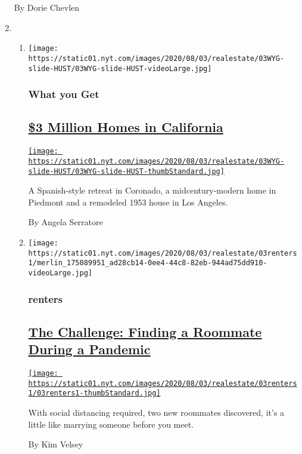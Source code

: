 \begin{enumerate}
  By Dorie Chevlen
\item
  \begin{enumerate}
  \def\labelenumii{\arabic{enumii}.}
  \item
    \texttt{[image: https://static01.nyt.com/images/2020/08/03/realestate/03WYG-slide-HUST/03WYG-slide-HUST-videoLarge.jpg]}

    \hypertarget{what-you-get}{%
    \subsubsection{What you Get}\label{what-you-get}}

    \hypertarget{3-million-homes-in-california}{%
    \subsection{\texorpdfstring{\href{/2020/08/03/realestate/3-million-dollar-homes-for-sale-ca.html}{\$3
    Million Homes in
    California}}{\$3 Million Homes in California}}\label{3-million-homes-in-california}}

    \href{/2020/08/03/realestate/3-million-dollar-homes-for-sale-ca.html}{\texttt{[image: https://static01.nyt.com/images/2020/08/03/realestate/03WYG-slide-HUST/03WYG-slide-HUST-thumbStandard.jpg]}}

    A Spanish-style retreat in Coronado, a midcentury-modern home in
    Piedmont and a remodeled 1953 house in Los Angeles.

    By Angela Serratore
  \item
    \texttt{[image: https://static01.nyt.com/images/2020/08/03/realestate/03renters1/merlin\_175089951\_ad28cb14-0ee4-44c8-82eb-944ad75dd910-videoLarge.jpg]}

    \hypertarget{renters}{%
    \subsubsection{renters}\label{renters}}

    \hypertarget{the-challenge-finding-a-roommate-during-a-pandemic}{%
    \subsection{\texorpdfstring{\href{/2020/08/03/realestate/coronavirus-roommate-renters.html}{The
    Challenge: Finding a Roommate During a
    Pandemic}}{The Challenge: Finding a Roommate During a Pandemic}}\label{the-challenge-finding-a-roommate-during-a-pandemic}}

    \href{/2020/08/03/realestate/coronavirus-roommate-renters.html}{\texttt{[image: https://static01.nyt.com/images/2020/08/03/realestate/03renters1/03renters1-thumbStandard.jpg]}}

    With social distancing required, two new roommates discovered, it's
    a little like marrying someone before you meet.

    By Kim Velsey
  \end{enumerate}
\end{enumerate}

